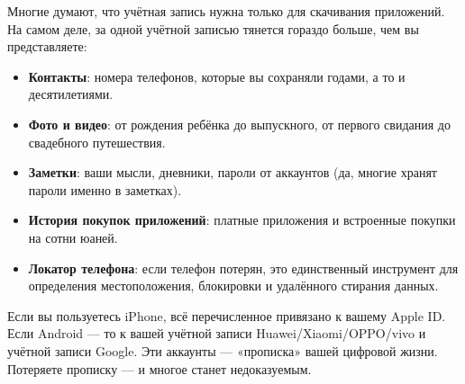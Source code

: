 


Многие думают, что учётная запись нужна только для скачивания приложений. На самом деле, за одной учётной записью тянется гораздо больше, чем вы представляете:

\begin{itemize}
  \item \textbf{Контакты}: номера телефонов, которые вы сохраняли годами, а то и десятилетиями.
  \item \textbf{Фото и видео}: от рождения ребёнка до выпускного, от первого свидания до свадебного путешествия.
  \item \textbf{Заметки}: ваши мысли, дневники, пароли от аккаунтов (да, многие хранят пароли именно в заметках).
  \item \textbf{История покупок приложений}: платные приложения и встроенные покупки на сотни юаней.
  \item \textbf{Локатор телефона}: если телефон потерян, это единственный инструмент для определения местоположения, блокировки и удалённого стирания данных.
\end{itemize}

Если вы пользуетесь iPhone, всё перечисленное привязано к вашему Apple ID. Если Android — то к вашей учётной записи Huawei/Xiaomi/OPPO/vivo и учётной записи Google. Эти аккаунты — «прописка» вашей цифровой жизни. Потеряете прописку — и многое станет недоказуемым.


